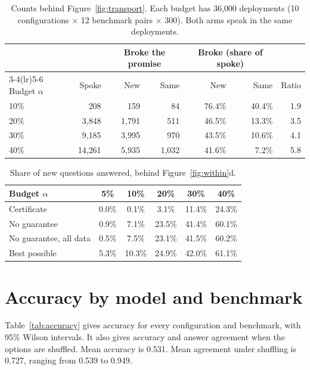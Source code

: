 \documentclass[11pt]{article}
\theoremstyle{plain}
\theoremstyle{definition}
\begin{document}
\begin{table}[H]
\centering
\small
\caption{Counts behind Figure~\ref{fig:transport}. Each budget has 36{,}000 deployments (10 configurations $\times$ 12 benchmark pairs $\times$ 300). Both arms speak in the same deployments.}
\label{tab:transport}
\begin{tabular}{lrrrrrr}
\toprule
 & & \multicolumn{2}{c}{Broke the promise} & \multicolumn{2}{c}{Broke (share of spoke)} & \\
\cmidrule(lr){3-4}\cmidrule(lr){5-6}
Budget $\alpha$ & Spoke & New & Same & New & Same & Ratio \\
\midrule
10\% & 208     & 159   & 84    & 76.4\% & 40.4\% & 1.9 \\
20\% & 3{,}848  & 1{,}791 & 511   & 46.5\% & 13.3\% & 3.5 \\
30\% & 9{,}185  & 3{,}995 & 970   & 43.5\% & 10.6\% & 4.1 \\
40\% & 14{,}261 & 5{,}935 & 1{,}032 & 41.6\% & 7.2\%  & 5.8 \\
\bottomrule
\end{tabular}
\end{table}

\begin{table}[H]
\centering
\small
\caption{Share of new questions answered, behind Figure~\ref{fig:within}d.}
\label{tab:coverage}
\begin{tabular}{lccccc}
\toprule
Budget $\alpha$ & 5\% & 10\% & 20\% & 30\% & 40\% \\
\midrule
Certificate & 0.0\% & 0.1\% & 3.1\% & 11.4\% & 24.3\% \\
No guarantee & 0.9\% & 7.1\% & 23.5\% & 41.4\% & 60.1\% \\
No guarantee, all data & 0.5\% & 7.5\% & 23.1\% & 41.5\% & 60.2\% \\
Best possible & 5.3\% & 10.3\% & 24.9\% & 42.0\% & 61.1\% \\
\bottomrule
\end{tabular}
\end{table}

\section{Accuracy by model and benchmark}

Table~\ref{tab:accuracy} gives accuracy for every configuration and benchmark, with 95\% Wilson intervals. It also gives accuracy and answer agreement when the options are shuffled. Mean accuracy is 0.531. Mean agreement under shuffling is 0.727, ranging from 0.539 to 0.949.
\end{document}
